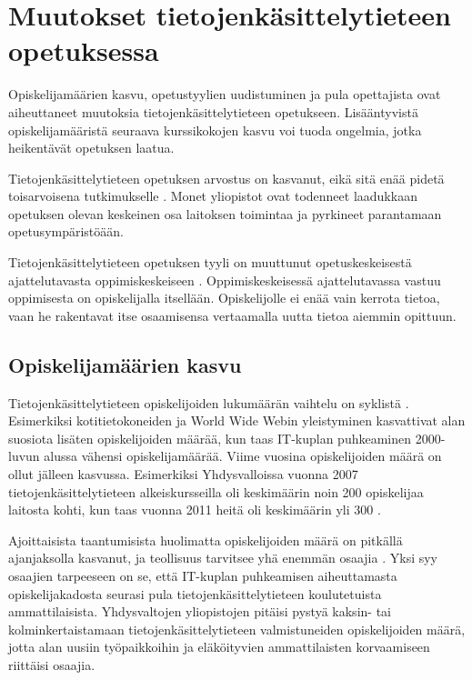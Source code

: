 \documentclass[finnish]{tktltiki2}
\theoremstyle{definition}
\theoremstyle{remark}
\begin{document}
\section{Muutokset tietojenkäsittelytieteen opetuksessa}

Opiskelijamäärien kasvu, opetustyylien uudistuminen ja pula opettajista ovat aiheuttaneet muutoksia tie\-to\-jen\-kä\-sit\-te\-ly\-tie\-teen opetukseen. Lisääntyvistä opiskelijamääristä seuraava kurssikokojen kasvu voi tuoda ongelmia, jotka heikentävät opetuksen laatua.  \par

Tie\-to\-jen\-kä\-sit\-te\-ly\-tie\-teen opetuksen arvostus on kasvanut, eikä sitä enää pidetä toisarvoisena tutkimukselle \cite{Biggs07}. Monet yliopistot ovat todenneet laadukkaan opetuksen olevan keskeinen osa laitoksen toimintaa ja pyrkineet parantamaan opetusympäristöään. \par

Tietojenkäsittelytieteen opetuksen tyyli on muuttunut opetuskeskeisestä ajattelutavasta oppimiskeskeiseen \cite{Yadin11}. Op\-pi\-mis\-kes\-kei\-ses\-sä ajattelutavassa vastuu oppimisesta on opiskelijalla itsellään. Opiskelijolle ei enää vain kerrota tietoa, vaan he rakentavat itse osaamisensa vertaamalla uutta tietoa aiemmin opittuun. \par


\subsection{Opiskelijamäärien kasvu}
Tietojenkäsittelytieteen opiskelijoiden lukumäärän vaihtelu on syklistä \cite{Roberts11}. Esimerkiksi kotitietokoneiden ja World Wide Webin yleistyminen kasvattivat alan suosiota lisäten opiskelijoiden määrää, kun taas IT-kuplan puhkeaminen 2000-luvun alussa vähensi opiskelijamäärää. Viime vuosina opiskelijoiden määrä on ollut jälleen kasvussa. Esimerkiksi Yhdysvalloissa vuonna 2007 tie\-to\-jen\-kä\-sit\-te\-ly\-tie\-teen alkeiskursseilla oli keskimäärin noin 200 opiskelijaa laitosta kohti, kun taas vuonna 2011 heitä oli keskimäärin yli 300 \cite{TaulbeeReport}.  \par

Ajoittaisista taantumisista huolimatta opiskelijoiden määrä on pitkällä ajanjaksolla kasvanut, ja teollisuus tarvitsee yhä enemmän osaajia \cite{Roberts11}. Yksi syy osaajien tarpeeseen on se, että IT-kuplan puhkeamisen aiheuttamasta opiskelijakadosta seurasi pula tie\-to\-jen\-kä\-sit\-te\-ly\-tie\-teen koulutetuista ammattilaisista. Yhdysvaltojen yliopistojen pitäisi pystyä kaksin- tai kolminkertaistamaan tie\-to\-jen\-kä\-sit\-te\-ly\-tie\-teen valmistuneiden opiskelijoiden määrä, jotta alan uusiin työpaikkoihin ja eläköityvien ammattilaisten korvaamiseen riittäisi osaajia. \cite{Roberts11} \par
\end{document}
